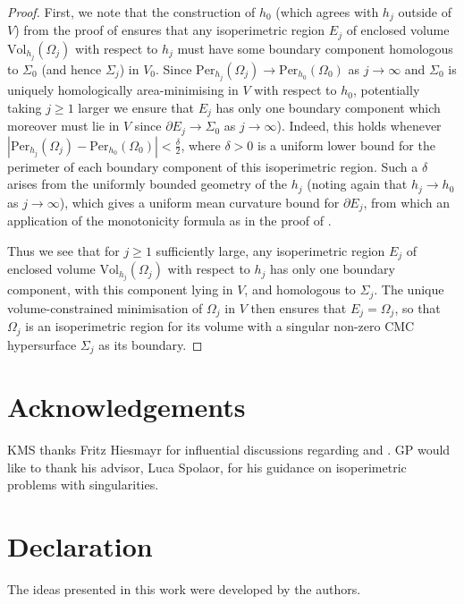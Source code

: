 \documentclass[12pt]{article}
\begin{document}
\begin{proof}
\bigskip

First, we note that the construction of $h_0$ (which agrees with $h_j$ outside of $V$) from the proof of \cite[Theorem 1]{MN26} ensures that any isoperimetric region $E_j$ of enclosed volume $\mathrm{Vol}_{h_j}(\Omega_j)$ with respect to $h_j$ must have some boundary component homologous to $\Sigma_0$ (and hence $\Sigma_j$) in $V_0$. Since $\mathrm{Per}_{h_j}(\Omega_j) \rightarrow \mathrm{Per}_{h_0}(\Omega_0)$ as $j \rightarrow \infty$ and $\Sigma_0$ is uniquely homologically area-minimising in $V$ with respect to $h_0$, potentially taking $j \geq 1$ larger we ensure that $E_j$ has only one boundary component which moreover must lie in $V$ since $\partial E_j \rightarrow \Sigma_0$ as $j \rightarrow \infty$). Indeed, this holds whenever 
$|\mathrm{Per}_{h_j}(\Omega_j) - \mathrm{Per}_{h_0}(\Omega_0)| < \frac{\delta}{2}$,
where $\delta > 0$ is a uniform lower bound for the perimeter of each boundary component of this isoperimetric region. Such a $\delta$ arises from the uniformly bounded geometry of the $h_j$ (noting again that $h_j \rightarrow h_0$ as $j \rightarrow \infty$), which gives a uniform mean curvature bound for $\partial E_j$, from which an application of the monotonicity formula as in the proof of \cite[Theorem 1]{MN26}. 

\bigskip

Thus we see that for $j \geq 1$ sufficiently large, any isoperimetric region $E_j$ of enclosed volume $\mathrm{Vol}_{h_j}(\Omega_j)$ with respect to $h_j$ has only one boundary component, with this component lying in $V$, and homologous to $\Sigma_j$. The unique volume-constrained minimisation of $\Omega_j$ in $V$ then ensures that $E_j = \Omega_j$, so that $\Omega_j$ is an isoperimetric region for its volume with a singular non-zero CMC hypersurface $\Sigma_j$ as its boundary.
\end{proof}


\section*{Acknowledgements} KMS thanks Fritz Hiesmayr for influential discussions regarding \cite{CHS84} and \cite{I17}. GP would like to thank his advisor, Luca Spolaor, for his guidance on isoperimetric problems with singularities.


\section*{Declaration} The ideas presented in this work were developed by the authors.
\end{document}
